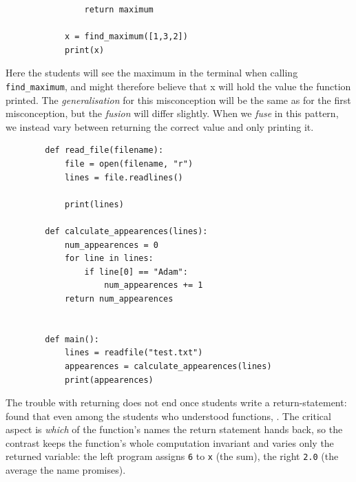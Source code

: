 \begin{enumerate}
\begin{minipage}[t]{0.45\columnwidth}
\begin{verbatim}
                return maximum
    
            x = find_maximum([1,3,2])
            print(x)
        \end{verbatim}
    \end{minipage}
\hfill

    Here the students will see the maximum in the terminal when calling 
\texttt{find_maximum}, and might therefore believe that x 
will hold the value the function printed. The \emph{generalisation} 
for this misconception will be the same as for the first 
misconception, but the \emph{fusion} will differ slightly. When we 
\emph{fuse} in this pattern, we instead vary between returning the 
correct value and only printing it.
     \hfill
        \begin{verbatim}
        def read_file(filename):
            file = open(filename, "r")
            lines = file.readlines()

            print(lines)
            
        def calculate_appearences(lines):
            num_appearences = 0
            for line in lines:
                if line[0] == "Adam":
                    num_appearences += 1
            return num_appearences
            

        def main():
            lines = readfile("test.txt")
            appearences = calculate_appearences(lines)
            print(appearences)
        \end{verbatim}
\hfill
    
\end{enumerate}

The trouble with returning does not end once students write a
return-statement: \textcite{KumarVeerasamy2016} found that even among the
students who understood functions,
.
The critical aspect is \emph{which} of the function's names the return
statement hands back, so the contrast keeps the function's whole computation
invariant and varies only the returned variable: the left program assigns
\texttt{6} to \texttt{x} (the sum), the right
\texttt{2.0} (the average the name promises).

